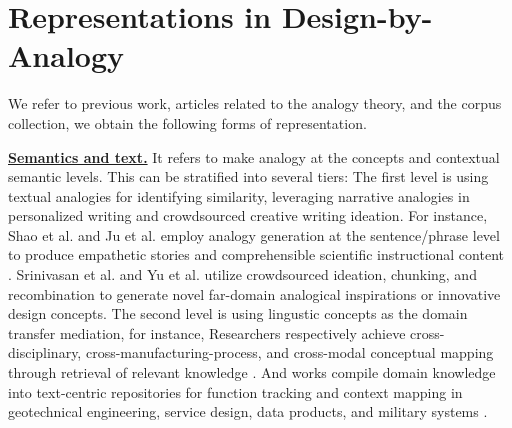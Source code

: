 \section{Representations in Design-by-Analogy} %
We refer to previous work\cite{hertzmann2023image, linsey2008modality}, articles related to the analogy theory\cite{gentner1983structure}, and the corpus collection, we obtain the following forms of representation.

\textbf{\underline{Semantics and text.}} It refers to make analogy at the concepts and contextual semantic levels. This can be stratified into several tiers: The first level is using textual analogies for identifying similarity, leveraging narrative analogies in personalized writing and crowdsourced creative writing ideation. For instance, Shao et al. and Ju
et al. employ analogy generation at the sentence/phrase level to produce empathetic stories and comprehensible scientific instructional content \cite{shao2025unlock, Ju2025toward}. Srinivasan et al. and Yu et al. utilize crowdsourced ideation, chunking, and recombination to generate novel far-domain analogical inspirations or innovative design concepts\cite{srinivasan2024improving, yu2014distributed}. The second level is using lingustic concepts as the domain transfer mediation, for instance, Researchers respectively achieve cross-disciplinary, cross-manufacturing-process, and cross-modal conceptual mapping through retrieval of relevant knowledge\cite{zheng2024disciplink, emerson2024anther, chen2024BIDTrain, yan2023xcreation} . And works compile domain knowledge into text-centric repositories for function tracking and context mapping in geotechnical engineering, service design, data products, and military systems \cite{you2018design, moreno2014analogies, chen2024beyond, yucelmics2018procedure}.



